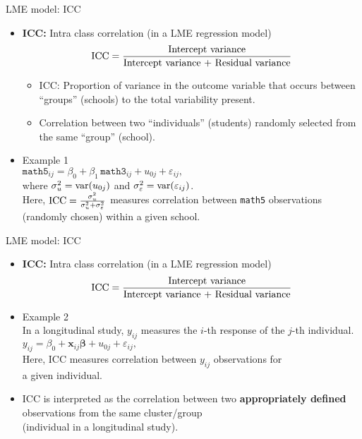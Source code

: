 \documentclass{beamer}
\begin{document}
\begin{frame}{LME model: ICC}
\begin{itemize}
\item \textbf{ICC:} Intra class correlation (in a LME regression model) \qquad
$$ \textnormal{ICC}=\frac{\textnormal{Intercept variance}}{\textnormal{Intercept variance + Residual variance}} $$
\begin{itemize}
    \item ICC: Proportion of variance in the outcome variable that occurs between ``groups'' (schools) to the total variability present.
    \item Correlation between two ``individuals'' (students) randomly selected from the same ``group'' (school).
\end{itemize}
\medskip
\item Example 1\\ \medskip
$\texttt{math5}_{ij} = \beta_{0} + \beta_1 \, \texttt{math3}_{ij} + u_{0j} + \varepsilon_{ij},$\\ \medskip
where $\sigma^2_u = \textnormal{var}(u_{0j})$ and $\sigma^2_{\varepsilon} = \textnormal{var}(\varepsilon_{ij})$.\\ \smallskip
Here, $\textnormal{ICC}=\frac{\sigma^2_u}{\sigma^2_u + \sigma^2_{\varepsilon}}$  measures correlation between \texttt{math5}  observations (randomly chosen) within a given school.
\end{itemize}
\end{frame}
\begin{frame}{LME model: ICC}
\begin{itemize}
\item \textbf{ICC:} Intra class correlation (in a LME regression model) \qquad
$$ \textnormal{ICC}=\frac{\textnormal{Intercept variance}}{\textnormal{Intercept variance + Residual variance}} $$
\medskip
\item Example 2\\ \medskip
In a longitudinal study, $y_{ij}$ measures the $i$-th response of the $j$-th individual. \\ \medskip
$y_{ij} = \beta_{0} + \bm{x}_{ij} \bm{\beta} + u_{0j} + \varepsilon_{ij},$\\ \medskip
Here, ICC measures correlation between $y_{ij}$  observations for \\a given individual.
\medskip
\item ICC is interpreted as the correlation between two \textbf{appropriately defined} observations from the same cluster/group \\(individual in a longitudinal study). 
\end{itemize}
\end{frame}
\end{document}
